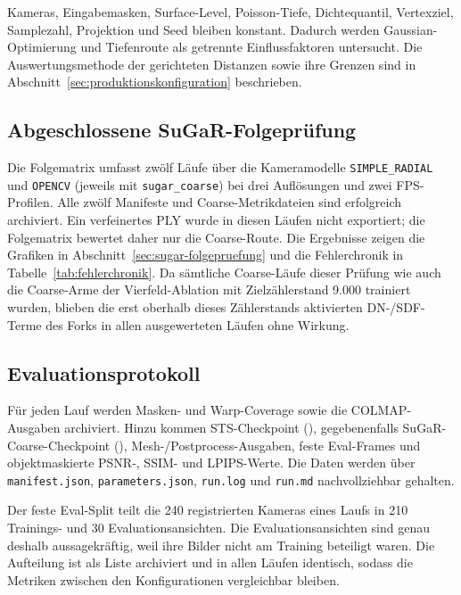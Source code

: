Kameras, Eingabemasken, Surface-Level, Poisson-Tiefe, Dichtequantil,
Vertexziel, Samplezahl, Projektion und Seed bleiben konstant. Dadurch werden
Gaussian-Optimierung und Tiefenroute als getrennte Einflussfaktoren untersucht.
Die Auswertungsmethode der gerichteten Distanzen sowie ihre Grenzen sind in
Abschnitt~\ref{sec:produktionskonfiguration} beschrieben.

\subsection{Abgeschlossene SuGaR-Folgeprüfung}
\label{subsec:sugar-folgepruefung}

Die Folgematrix umfasst zwölf Läufe über die Kameramodelle
\texttt{SIMPLE\_RADIAL} und \texttt{OPENCV} (jeweils mit
\texttt{sugar\_coarse}) bei drei Auflösungen und zwei FPS-Profilen. Alle zwölf
Manifeste und Coarse-Metrikdateien sind erfolgreich
archiviert. Ein verfeinertes PLY wurde in diesen Läufen nicht exportiert; die
Folgematrix bewertet daher nur die Coarse-Route. Die Ergebnisse zeigen die
Grafiken in Abschnitt~\ref{sec:sugar-folgepruefung} und die Fehlerchronik in
Tabelle~\ref{tab:fehlerchronik}. Da sämtliche Coarse-Läufe dieser Prüfung wie
auch die Coarse-Arme der Vierfeld-Ablation mit Zielzählerstand 9.000 trainiert
wurden, blieben die erst oberhalb dieses Zählerstands aktivierten DN-/SDF-
Terme des Forks in allen ausgewerteten Läufen ohne Wirkung.


\subsection{Evaluationsprotokoll}

Für jeden Lauf werden Masken- und Warp-Coverage sowie die COLMAP-Ausgaben
archiviert. Hinzu kommen STS-Checkpoint (), gegebenenfalls
SuGaR-Coarse-Checkpoint (), Mesh-/Postprocess-Ausgaben, feste
Eval-Frames und objektmaskierte PSNR-, SSIM- und LPIPS-Werte. Die Daten werden über
\texttt{manifest.json}, \texttt{parameters.json}, \texttt{run.log} und
\texttt{run.md} nachvollziehbar gehalten.

Der feste Eval-Split teilt die 240 registrierten Kameras eines Laufs in 210
Trainings- und 30 Evaluationsansichten. Die Evaluationsansichten sind genau
deshalb aussagekräftig, weil ihre Bilder nicht am Training beteiligt waren.
Die Aufteilung ist als Liste archiviert und in allen Läufen identisch, sodass
die Metriken zwischen den Konfigurationen vergleichbar bleiben.

